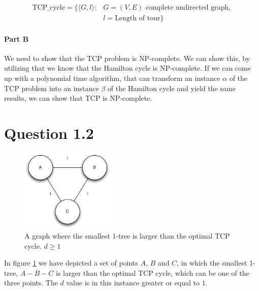 \documentclass[10pt]{article}
\begin{document}
\begin{align*}
   \text{TCP_cycle} = \{ \langle G, l \rangle : &G = (V,E) \text{ complete undirected graph},\\ 
                                               &l = \text{Length of tour}  \}
\end{align*}


\paragraph{Part B} %
\label{par:part_b}
We need to show that the TCP problem is NP-complete.  We can show this, by utilizing that we know that the Hamilton cycle is NP-complete. If we can come up with a polynomial time algorithm, that can transform an instance $\alpha$ of the TCP problem into an instance $\beta$ of the Hamilton cycle and yield the same results, we can show that TCP is NP-complete.

\section*{Question 1.2} %
\label{sec:question_1_2}

\begin{figure}
	\centering
	\includegraphics[width=0.4\textwidth]{figures/unicycle.pdf}
	\caption{A graph where the smallest 1-tree is larger than the optimal TCP cycle. $d \geq 1$}
	\label{unicycle}
\end{figure}
In figure \ref{unicycle} we have depicted a set of points $A$, $B$ and $C$, in which the smallest 1-tree, $A-B-C$ is larger than the optimal TCP cycle, which can be one of the three points.
The $d$ value is in this instance greater or equal to $1$.
\end{document}
